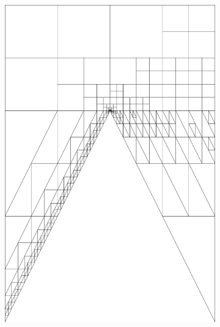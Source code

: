 \documentclass[mathserif]{beamer}
\begin{document}
\begin{frame}
{\begin{figure}
\begin{subfigure}[t]{0.4\textwidth}
\includegraphics[width=\textwidth]{../figs/Wedge/robust16c_mesh2.png}
\end{subfigure}
\end{figure}
}
\end{frame}
\end{document}
